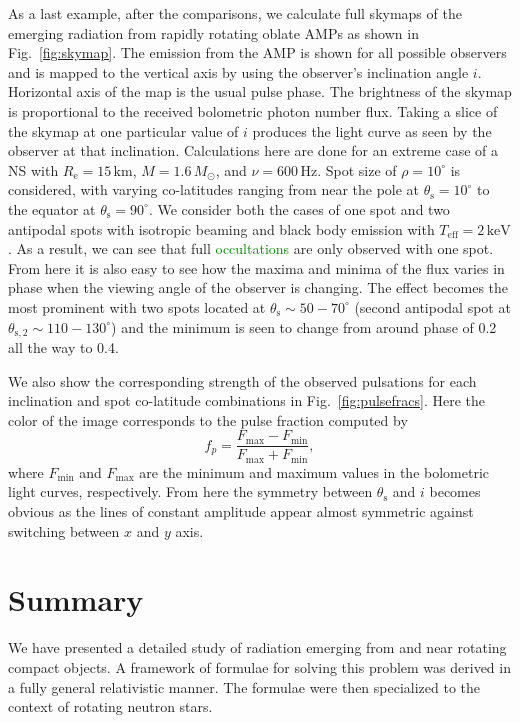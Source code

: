 \documentclass{aa}
\newcommand{\be}{\begin{equation}}
\newcommand{\ee}{\end{equation}}
\newcommand{\refe}[1]{\textcolor{green}{{#1}}}
\newcommand{\Msun}{\ensuremath{M_{\odot}}}
\begin{document}
As a last example, after the comparisons, we calculate full skymaps of the emerging radiation from rapidly rotating oblate AMPs as shown in Fig.~\ref{fig:skymap}.
The emission from the AMP is shown for all possible observers and is mapped to the vertical axis by using the observer's inclination angle $i$.
Horizontal axis of the map is the usual pulse phase.
The brightness of the skymap is proportional to the received bolometric photon number flux.
Taking a slice of the skymap at one particular value of $i$ produces the light curve as seen by the observer at that inclination.
Calculations here are done for an extreme case of a NS with $R_{\mathrm{e}} = 15\,\mathrm{km}$, $M=1.6\,\Msun$, and $\nu = 600\,\mathrm{Hz}$.
Spot size of $\rho = 10^{\circ}$ is considered, with varying co-latitudes ranging from near the pole at $\theta_{\mathrm{s}} = 10^{\circ}$ to the equator at $\theta_{\mathrm{s}} = 90^{\circ}$.
We consider both the cases of one spot and two antipodal spots with isotropic beaming and black body emission with $T_{\mathrm{eff}} = 2\,\mathrm{keV}$.
As a result, we can see that full \refe{occultations} are only observed with one spot.
From here it is also easy to see how the maxima and minima of the flux varies in phase when the viewing angle of the observer is changing.
The effect becomes the most prominent with two spots located at $\theta_{\mathrm{s}} \sim 50-70^{\circ}$ (second antipodal spot at $\theta_{\mathrm{s,2}} \sim 110-130^{\circ}$) and the minimum is seen to change from around phase of 0.2 all the way to 0.4.

We also show the corresponding strength of the observed pulsations for each inclination and spot co-latitude combinations in Fig.~\ref{fig:pulsefracs}.
Here the color of the image corresponds to the pulse fraction computed by
\be
f_p = \frac{F_{\mathrm{max}} - F_{\mathrm{min}}}{F_{\mathrm{max}} + F_{\mathrm{min}}},
\ee
where $F_{\mathrm{min}}$ and $F_{\mathrm{max}}$ are the minimum and maximum values in the bolometric light curves, respectively.
From here the symmetry between $\theta_{\mathrm{s}}$ and $i$ becomes obvious as the lines of constant amplitude appear almost symmetric against switching between $x$ and $y$ axis.




\section{Summary}\label{sect:summary}
We have presented a detailed study of radiation emerging from and near rotating compact objects.
A framework of formulae for solving this problem was derived in a fully general relativistic manner. 
The formulae were then specialized to the context of rotating neutron stars.
\end{document}
